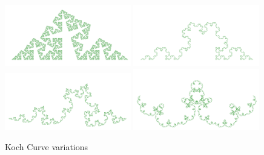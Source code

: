             \begin{figure}[ht]
                \caption{\label{koch_variatinos_01} Koch Curve variations}
                \centering
                \includegraphics[width=0.49\textwidth]{img/Simple_Variations/koch_variation_01.png}
                \includegraphics[width=0.49\textwidth]{img/Simple_Variations/koch_variation_02.png}
                \includegraphics[width=0.49\textwidth]{img/Simple_Variations/koch_variation_03.png}
                \includegraphics[width=0.49\textwidth]{img/Simple_Variations/koch_variation_04.png}
            \end{figure}

            \FloatBarrier
